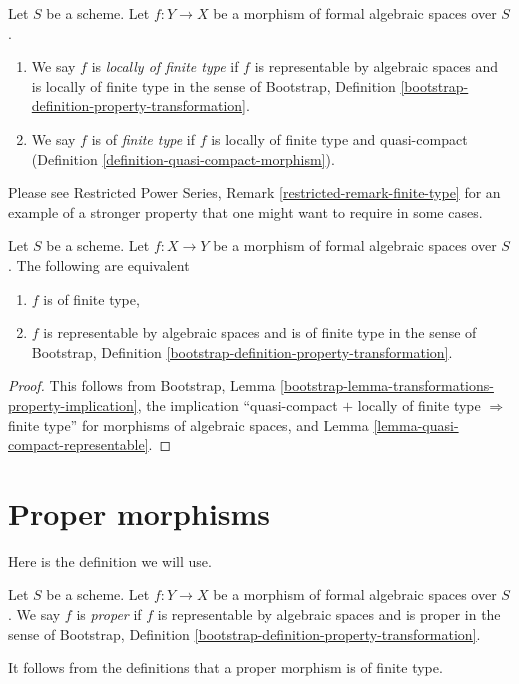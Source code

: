 \begin{definition}
\label{definition-finite-type}
Let $S$ be a scheme. Let $f : Y \to X$ be a morphism of formal algebraic
spaces over $S$.
\begin{enumerate}
\item We say $f$ is {\it locally of finite type}
if $f$ is representable by algebraic spaces and is locally
of finite type in the sense of
Bootstrap, Definition \ref{bootstrap-definition-property-transformation}.
\item We say $f$ is of {\it finite type} if $f$ is locally of finite type and
quasi-compact (Definition \ref{definition-quasi-compact-morphism}).
\end{enumerate}
\end{definition}

\noindent
Please see Restricted Power Series, Remark \ref{restricted-remark-finite-type}
for an example of a stronger property that one might
want to require in some cases.

\begin{lemma}
\label{lemma-characterize-finite-type}
Let $S$ be a scheme. Let $f : X \to Y$ be a morphism of formal algebraic
spaces over $S$. The following are equivalent
\begin{enumerate}
\item $f$ is of finite type,
\item $f$ is representable by algebraic spaces and is of finite type in
the sense of
Bootstrap, Definition \ref{bootstrap-definition-property-transformation}.
\end{enumerate}
\end{lemma}

\begin{proof}
This follows from Bootstrap, Lemma
\ref{bootstrap-lemma-transformations-property-implication},
the implication ``quasi-compact $+$ locally of finite type
$\Rightarrow$ finite type'' for morphisms of algebraic spaces, and
Lemma \ref{lemma-quasi-compact-representable}.
\end{proof}




\section{Proper morphisms}
\label{section-proper}

\noindent
Here is the definition we will use.

\begin{definition}
\label{definition-proper}
Let $S$ be a scheme. Let $f : Y \to X$ be a morphism of formal algebraic
spaces over $S$. We say $f$ is {\it proper}
if $f$ is representable by algebraic spaces and is proper in the sense of
Bootstrap, Definition \ref{bootstrap-definition-property-transformation}.
\end{definition}

\noindent
It follows from the definitions that a proper morphism is of finite type.




















